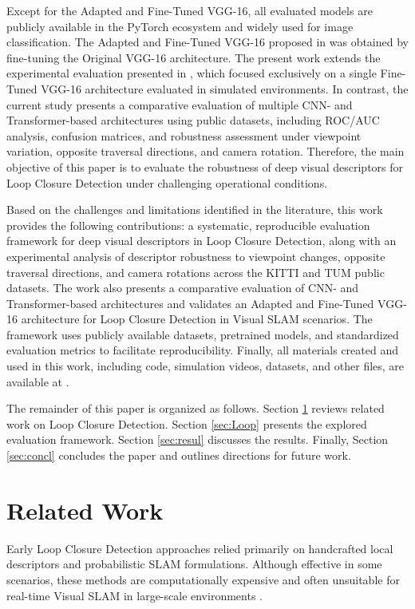\documentclass{ieeeaccess}
\begin{document}
Except for the Adapted and Fine-Tuned VGG-16, all evaluated models are publicly available in the PyTorch ecosystem and widely used for image classification. The Adapted and Fine-Tuned VGG-16 proposed in \cite{Iegawa2023LoopClosureCNN} was obtained by fine-tuning the Original VGG-16 architecture. The present work extends the experimental evaluation presented in \cite{Iegawa2023LoopClosureCNN}, which focused exclusively on a single Fine-Tuned VGG-16 architecture evaluated in simulated environments. In contrast, the current study presents a comparative evaluation of multiple CNN- and Transformer-based architectures using public datasets, including ROC/AUC analysis, confusion matrices, and robustness assessment under viewpoint variation, opposite traversal directions, and camera rotation. Therefore, the main objective of this paper is to evaluate the robustness of deep visual descriptors for Loop Closure Detection under challenging operational conditions.

Based on the challenges and limitations identified in the literature, this work provides the following contributions: a systematic, reproducible evaluation framework for deep visual descriptors in Loop Closure Detection, along with an experimental analysis of descriptor robustness to viewpoint changes, opposite traversal directions, and camera rotations across the KITTI and TUM public datasets. The work also presents a comparative evaluation of CNN- and Transformer-based architectures and validates an Adapted and Fine-Tuned VGG-16 architecture for Loop Closure Detection in Visual SLAM scenarios. The framework uses publicly available datasets, pretrained models, and standardized evaluation metrics to facilitate reproducibility. Finally, all materials created and used in this work, including code, simulation videos, datasets, and other files, are available at \cite{IegawaBotelho2022LoopClosureGitHub}. 

The remainder of this paper is organized as follows. Section \ref{sec:Related} reviews related work on Loop Closure Detection. Section \ref{sec:Loop} presents the explored evaluation framework. Section \ref{sec:resul} discusses the results. Finally, Section \ref{sec:concl} concludes the paper and outlines directions for future work.

\section{Related Work}
\label{sec:Related}

Early Loop Closure Detection approaches relied primarily on handcrafted local descriptors and probabilistic SLAM formulations. Although effective in some scenarios, these methods are computationally expensive and often unsuitable for real-time Visual SLAM in large-scale environments \cite{Arshad2021}.
\end{document}

